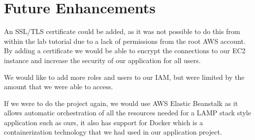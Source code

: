 \chapter{Future Enhancements}\label{ch:future-enhancements}
An SSL/TLS certificate could be added, as it was not possible to do this from within the lab tutorial due to a lack of permissions from the root AWS account.
By adding a certificate we would be able to encrypt the connections to our EC2 instance and increase the security of our application for all users.

We would like to add more roles and users to our IAM, but were limited by the amount that we were able to access.

If we were to do the project again, we would use AWS Elastic Beanstalk as it allows automatic orchestration of all the resources needed for a LAMP stack style application such as ours, it also has support for Docker which is a containerization technology that we had used in our application project.